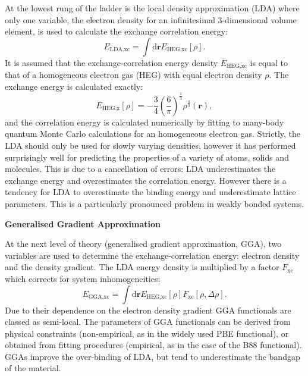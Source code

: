 At the lowest rung of the ladder is the local density approximation (LDA) where only one variable, the electron density for an infinitesimal 3-dimensional volume element, is used to calculate the exchange correlation energy:\autocite{Henderson2008}
\begin{equation}
E_{\textrm{LDA,xc}} = \int \textrm{d}\mathbf{r} E_{\textrm{HEG,xc}}\left[\rho\right].
\end{equation}
It is assumed that the exchange-correlation energy density $E_{\textrm{HEG,xc}}$ is equal to that of a homogeneous electron gas (HEG) with equal electron density $\rho$. The exchange energy is calculated exactly:\autocite{Henderson2008}
\begin{equation}
E_{\textrm{HEG,x}}\left[\rho\right] = -\frac{3}{4}\left(\frac{6}{\pi}\right)^{\frac{1}{3}} \rho^{\frac{4}{3}}\left(\textbf{r}\right),
\end{equation}
and the correlation energy is calculated numerically by fitting to many-body quantum Monte Carlo calculations for an homogeneous electron gas.\autocite{Ceperley1980} %
Strictly, the LDA should only be used for slowly varying densities, however it has performed surprisingly well for predicting the properties of a variety of atoms, solids and molecules. This is due to a cancellation of errors: LDA underestimates the exchange energy and overestimates the correlation energy.\autocite{Burke2007} However there is a tendency for LDA to overestimate the binding energy and underestimate lattice parameters. This is a particularly pronounced problem in weakly bonded systems.

\textbf{Generalised Gradient Approximation}

At the next level of theory (generalised gradient approximation, GGA), two variables are used to determine the exchange-correlation energy: electron density and the density gradient. The LDA energy density is multiplied by a factor $F_\textrm{xc}$ which corrects for system inhomogeneities:\autocite{Henderson2008}
\begin{equation}
E_{\textrm{GGA,xc}} = \int \textrm{d}\mathbf{r} E_{\textrm{HEG,xc}}\left[\rho\right]F_\textrm{xc}\left[\rho,\Delta\rho\right].
\end{equation}
Due to their dependence on the electron density gradient GGA functionals are classed as semi-local. The parameters of GGA functionals can be derived from physical constraints (non-empirical, as in the widely used PBE functional), or obtained from fitting procedures (empirical, as in the case of the B88 functional). GGAs improve the over-binding of LDA, but tend to underestimate the bandgap of the material.

